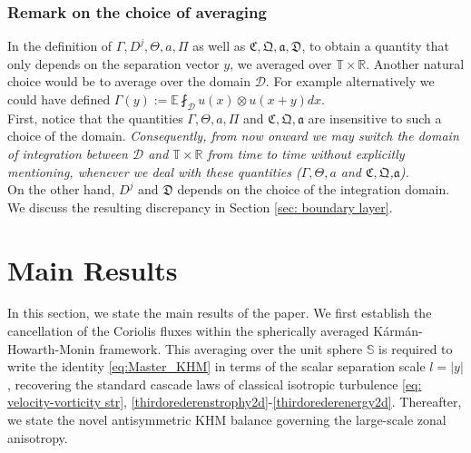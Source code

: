 \documentclass[11pt,a4paper]{article}
\numberwithin{equation}{section}
\numberwithin{theorem}{section}
\numberwithin{remark}{section}
\numberwithin{definition}{section}
\begin{document}
\subsubsection{Remark on the choice of averaging} \label{rem:quadratic_vs_cubic}
In the definition of $\Gamma,D^j,\varTheta,a,\Pi$ as well as $\mathfrak{C},\mathfrak{Q},\mathfrak{a}, \mathfrak{D}$, to obtain a quantity that only depends on the separation vector $y$, we averaged over  $\mathbb{T} \times \mathbb{R}$. Another natural choice would be to average over the domain $\mathcal{D}$. For example  alternatively we could have defined $\Gamma(y):= \mathbb{E}\fint_{\mathcal{D}} u(x) \otimes u(x+y) dx$.   \\

First, notice that the quantities $\Gamma,\varTheta,a,\Pi $ and $\mathfrak{C},\mathfrak{Q},\mathfrak{a}$ are insensitive to such a choice of the domain. \textit{Consequently,  from now onward we may switch the domain of integration  between $\mathcal{D}$ and $\mathbb{T} \times \mathbb{R}$ from time to time without explicitly mentioning, whenever we deal with these quantities ($\Gamma,\varTheta,a$ and $\mathfrak{C},\mathfrak{Q}$,$\mathfrak{a}$).} \\

On the other hand, $D^j$ and $\mathfrak{D}$ depends on the choice of the integration domain. We discuss the resulting discrepancy in Section \ref{sec: boundary layer}. 






\section{Main Results}\label{sec:main_results}

In this section, we state the main results of the paper. We first establish the cancellation of the Coriolis fluxes within the spherically averaged Kármán-Howarth-Monin framework. This averaging over the unit sphere $\mathbb{S}$ is required to write the identity \eqref{eq:Master_KHM} in terms of the scalar separation scale $l = |y|$, recovering the standard cascade laws of classical isotropic turbulence \eqref{eq: velocity-vorticity str},  \eqref{thirdorederenstrophy2d}-\eqref{thirdorederenergy2d}. Thereafter, we state the novel antisymmetric KHM balance governing the large-scale zonal anisotropy.
\end{document}
